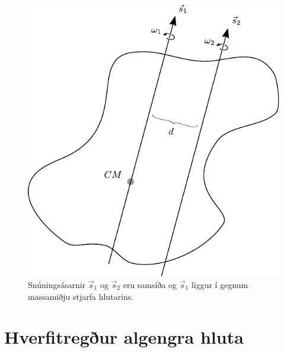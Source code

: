 \ifdefined \wholebook \else\documentclass[oneside]{book}\usepackage{EdlBook}\graphicspath{{figures/}}
\begin{document}
\begin{figure}[H]
    \centering
    \includegraphics[scale=1]{figures/steiner2.pdf}
    \caption{Snúningsásarnir $\vec{s}_1$ og $\vec{s}_2$ eru samsíða og $\vec{s}_1$ liggur í gegnum massamiðju stjarfa hlutarins.}
    \label{fig:steiner}
\end{figure}

\newpage

\section{Hverfitregður algengra hluta}
\end{document}
